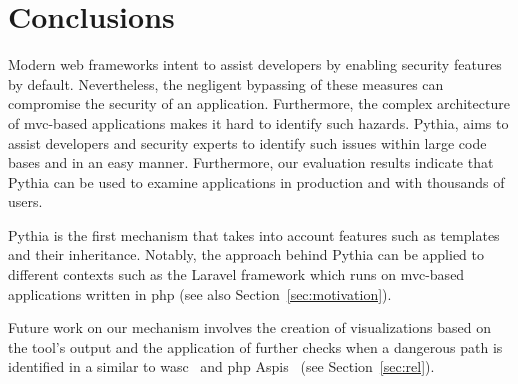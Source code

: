 \section{Conclusions}
\label{sec:conc}

Modern web frameworks intent to
assist developers by enabling
security features by default.
Nevertheless,
the negligent bypassing of these
measures can compromise 
the security of an application.
Furthermore,
the complex architecture of
{\sc mvc}-based applications
makes it hard to identify such hazards.
Pythia,
aims to assist developers and
security experts to identify
such issues within large code bases
and in an easy manner.
Furthermore,
our evaluation results indicate
that Pythia can be used to examine
applications in production and with
thousands of users.

Pythia is the first mechanism
that takes into account features
such as templates and their inheritance.
Notably,
the approach behind Pythia can be
applied to different contexts
such as the Laravel framework which
runs on {\sc mvc}-based applications
written in {\sc php}
(see also Section~\ref{sec:motivation}).

Future work on our mechanism
involves the creation of visualizations
based on the tool's output and the
application of further checks
when a dangerous path is identified
in a similar to
{\sc wasc}~\cite{NLC07} and
{\sc php} Aspis~\cite{PMP11}
(see Section~\ref{sec:rel}).


